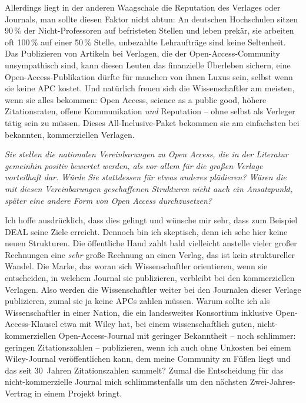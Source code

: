 \documentclass[a4paper,
fontsize=11pt,
oneside,
numbers=noperiodatend,
parskip=half-,
bibliography=totoc,
final
]{scrartcl}
\begin{document}
Allerdings liegt in der anderen Waagschale die Reputation des Verlages
oder Journals, man sollte diesen Faktor nicht abtun: An deutschen
Hochschulen sitzen 90\,\% der Nicht-Professoren auf befristeten Stellen
und leben prekär, sie arbeiten oft 100\,\% auf einer 50\,\% Stelle,
unbezahlte Lehraufträge sind keine Seltenheit. Das Publizieren von
Artikeln bei Verlagen, die der Open-Access-Community unsympathisch sind,
kann diesen Leuten das finanzielle Überleben sichern, eine
Open-Access-Publikation dürfte für manchen von ihnen Luxus sein, selbst
wenn sie keine APC kostet. Und natürlich freuen sich die Wissenschaftler
am meisten, wenn sie alles bekommen: Open Access, science as a public
good, höhere Zitationsraten, offene Kommunikation \emph{und} Reputation
-- ohne selbst als Verleger tätig sein zu müssen. Dieses
All-Inclusive-Paket bekommen sie am einfachsten bei bekannten,
kommerziellen Verlagen.

\emph{Sie stellen die nationalen Vereinbarungen zu Open Access, die in
der Literatur gemeinhin positiv bewertet werden, als vor allem für die
großen Verlage vorteilhaft dar. Würde Sie stattdessen für etwas anderes
plädieren? Wären die mit diesen Vereinbarungen geschaffenen Strukturen
nicht auch ein Ansatzpunkt, später eine andere Form von Open Access
durchzusetzen?}

Ich hoffe ausdrücklich, dass dies gelingt und wünsche mir sehr, dass zum
Beispiel DEAL seine Ziele erreicht. Dennoch bin ich skeptisch, denn ich
sehe hier keine neuen Strukturen. Die öffentliche Hand zahlt bald
vielleicht anstelle vieler großer Rechnungen eine \emph{sehr} große
Rechnung an einen Verlag, das ist kein struktureller Wandel. Die Marke,
das woran sich Wissenschaftler orientieren, wenn sie entscheiden, in
welchem Journal sie publizieren, verbleibt bei den kommerziellen
Verlagen. Also werden die Wissenschaftler weiter bei den Journalen
dieser Verlage publizieren, zumal sie ja keine APCs zahlen müssen. Warum
sollte ich als Wissenschaftler in einer Nation, die ein landesweites
Konsortium inklusive Open-Access-Klausel etwa mit Wiley hat, bei einem
wissenschaftlich guten, nicht-kommerziellen Open-Access-Journal mit
geringer Bekanntheit -- noch schlimmer: geringen Zitationszahlen --
publizieren, wenn ich auch ohne Unkosten bei einem Wiley-Journal
veröffentlichen kann, dem meine Community zu Füßen liegt und das seit
30~Jahren Zitationszahlen sammelt? Zumal die Entscheidung für das
nicht-kommerzielle Journal mich schlimmstenfalls um den nächsten
Zwei-Jahres-Vertrag in einem Projekt bringt.
\end{document}

